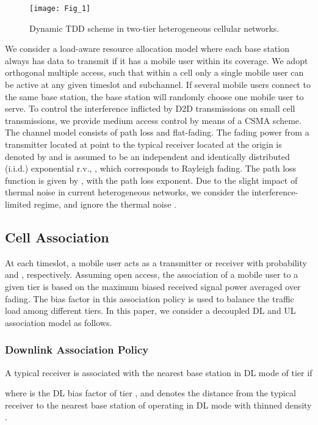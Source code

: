 \documentclass[twocolumn,english]{IEEEtran}
\theoremstyle{plain}
\theoremstyle{definition}
\begin{document}
\begin{figure}[t]
\centering\texttt{[image: Fig\_1]}\protect\caption{\label{fig:Bandwidth Partition}Dynamic TDD scheme in two-tier heterogeneous
cellular networks.}
\end{figure}


We consider a load-aware resource allocation model where each base
station always has data to transmit if it has a mobile user within
its coverage. We adopt orthogonal multiple access, such that within
a cell only a single mobile user can be active at any given timeslot
and subchannel. If several mobile users connect to the same base station,
the base station will randomly choose one mobile user to serve. To
control the interference inflicted by D2D transmissions on small cell
transmissions, we provide medium access control by means of a CSMA
scheme. The channel model consists of path loss and flat-fading. The
fading power from a transmitter located at point  to the typical
receiver located at the origin is denoted by  and is assumed
to be an independent and identically distributed (i.i.d.) exponential
r.v., , which corresponds to Rayleigh fading.
The path loss function is given by ,
with  the path loss exponent. Due to the slight impact
of thermal noise in current heterogeneous networks, we consider the
interference-limited regime, and ignore the thermal noise \cite{ATAT}.


\subsection{Cell Association}

At each timeslot, a mobile user acts as a transmitter or receiver
with probability  and , respectively. Assuming open
access, the association of a mobile user to a given tier is based
on the maximum biased received signal power averaged over fading.
The bias factor in this association policy is used to balance the
traffic load among different tiers. In this paper, we consider a decoupled
DL and UL association model as follows.


\subsubsection{Downlink Association Policy}

A typical receiver is associated with the nearest base station in
DL mode of tier\emph{  }if

where  is the DL bias factor of tier , and
 denotes the distance from the typical receiver
to the nearest base station of  operating in DL mode with
thinned density .
\end{document}
